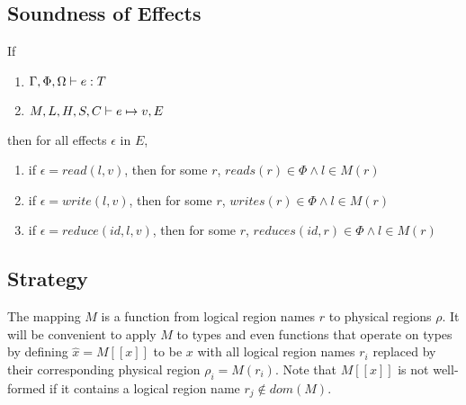 \subsection{Soundness of Effects}

If
\begin{enumerate}
\item $\Gamma, \Phi, \Omega \vdash e : T$
\item $M, L, H, S, C \vdash e \mapsto v, E$
\end{enumerate}
then for all effects $\epsilon$ in $E$,
\begin{enumerate}
\item if $\epsilon = read(l, v)$, then for some $r$, $reads(r) \in \Phi \wedge l \in M(r)$
\item if $\epsilon = write(l, v)$, then for some $r$, $writes(r) \in \Phi \wedge l \in M(r)$
\item if $\epsilon = reduce(id, l, v)$, then for some $r$, $reduces(id,r) \in \Phi \wedge l \in M(r)$
\end{enumerate}

\subsection{Strategy}

\newcommand{\llbracket}{[\![}
\newcommand{\rrbracket}{]\!]}

The mapping $M$ is a function from logical region names $r$ to physical regions $\rho$.  It will
be convenient to apply $M$ to types and even functions that operate on types by defining
$\hat x = M \llbracket x \rrbracket$ to be $x$ with all logical region names $r_i$ replaced by their
corresponding physical region $\rho_i = M(r_i)$.  Note that $M \llbracket x \rrbracket$ is not
well-formed if it contains a logical region name $r_j \not\in dom(M)$. \\

